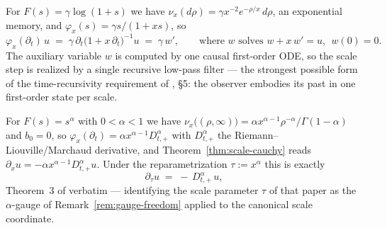 \begin{example}\label{ex:gamma-recursive}
For $F(s) = \gamma\log(1+s)$ we have $\nu_x(d\rho) = \gamma x^{-2} e^{-\rho/x}\,d\rho$, an
exponential memory, and $\varphi_x(s) = \gamma s/(1 + xs)$, so
\[
  \varphi_x(\partial_t)\,u \;=\; \gamma\,\partial_t\bigl(1 + x\,\partial_t\bigr)^{-1} u
  \;=\; \gamma\, w', \qquad \text{where } w \text{ solves } w + x\,w' = u,\ \ w(0) = 0 .
\]
The auxiliary variable $w$ is computed by one causal first-order ODE, so the scale step is
realized by a single recursive low-pass filter --- the strongest possible form of the
time-recursivity requirement of , \S5: the observer embodies
its past in one first-order state per scale.
\end{example}

\begin{remark}\label{rem:recovering-thm3}
For $F(s) = s^\alpha$ with $0 < \alpha < 1$ we have
$\nu_x\bigl((\rho,\infty)\bigr) = \alpha x^{\alpha-1}\rho^{-\alpha}/\Gamma(1-\alpha)$ and
$b_0 = 0$, so $\varphi_x(\partial_t) = \alpha x^{\alpha - 1} D^{\alpha}_{t,+}$ with
$D^{\alpha}_{t,+}$ the Riemann--Liouville/Marchaud derivative, and
Theorem~\ref{thm:scale-cauchy} reads
$\partial_x u = -\alpha x^{\alpha-1} D^{\alpha}_{t,+} u$. Under the reparametrization
$\tau := x^{\alpha}$ this is exactly
\[
  \partial_\tau u \;=\; -\,D^{\alpha}_{t,+}\, u,
\]
Theorem~3 of  verbatim --- identifying the scale parameter
$\tau$ of that paper as the $\alpha$-gauge of Remark~\ref{rem:gauge-freedom} applied to the
canonical scale coordinate.
\end{remark}
